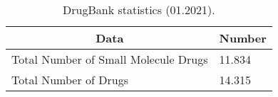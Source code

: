 \begin{table}[H]
\caption{DrugBank statistics (01.2021).}
\centering
\begin{tabular}{|l|l|}
\hline
\multicolumn{1}{|c|}{\textbf{Data}}  & \multicolumn{1}{c|}{\textbf{Number}} \\ \hline
Total Number of Small Molecule Drugs & 11.834                               \\ \hline
Total Number of Drugs                & 14.315                               \\ \hline
\end{tabular}
\label{tab:drugbank_stats}
\end{table}